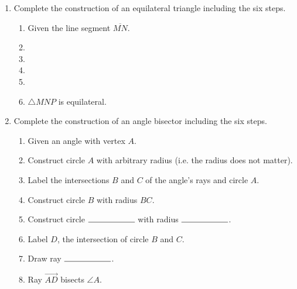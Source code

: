 \begin{enumerate}
\newpage
\item Complete the construction of an equilateral triangle including the six steps.
\begin{enumerate}
  \item Given the line segment $\overline{MN}$.
  \bigskip
  \item %
  \bigskip
  \item %
  \bigskip
  \item %
  \bigskip
  \item %
  \bigskip
  \item $\triangle MNP$ is equilateral.
\end{enumerate}
\vspace{7cm}
\begin{center}
\end{center}

\newpage
\item Complete the construction of an angle bisector including the six steps.
  \begin{enumerate}
    \item Given an angle with vertex $A$.
    \item Construct circle $A$ with arbitrary radius (i.e. the radius does not matter).
    \item Label the intersections $B$ and $C$ of the angle's rays and circle $A$.
    \item Construct circle $B$  with radius $BC$. \bigskip
    \item Construct circle $\rule{2cm}{0.15mm}$  with radius $\rule{2cm}{0.15mm}$. \bigskip
    \item Label $D$, the intersection of circle $B$ and $C$. \bigskip
    \item Draw ray $\rule{2cm}{0.15mm}$.
    \bigskip
    \item Ray $\overrightarrow {AD}$ bisects $\angle A$.
  \end{enumerate}
  \vspace{3cm}
  \begin{center}
  \end{center}


\end{enumerate}
